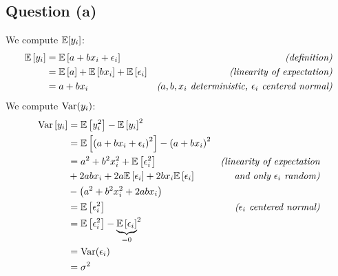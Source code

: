 \documentclass[12pt]{article}
\begin{document}
\subsection{Question (a)}
We compute \(\mathbb{E}[y_i]\):
\begin{align*}
    \mathbb{E} \left[ y_i \right]
     & = \mathbb{E} \left[ a + bx_i + \epsilon_i \right]                                      & \textit{(definition)}                                                  \\
     & = \mathbb{E} \left[ a \right] + \mathbb{E} \left[ b x_i \right] + \mathbb{E} \left[ \epsilon_i \right] & \textit{(linearity of expectation)}                                    \\
     & = a + b x_i                                                                    & \textit{(\(a, b, x_i\) deterministic, \(\epsilon_i\) centered normal)} \\
\end{align*}
We compute \(\textrm{Var}(y_i)\):
\begin{align*}
    \textrm{Var} \left[ y_i \right]
     & = \mathbb{E} \left[ y_i^2 \right] - \mathbb{E} \left[ y_i \right]^2                                                                              \\
     & = \mathbb{E} \left[ \left(a + bx_i + \epsilon_i \right)^2 \right] - \left(a + b x_i\right)^2                                             \\
     & = a^2 + b^2x_i^2 + \mathbb{E}\left[\epsilon_i^2\right]                                       & \textit{(linearity of expectation}        \\
     & + 2abx_i + 2a \mathbb{E} \left[\epsilon_i\right] + 2bx_i \mathbb{E}\left[\epsilon_i \right]          & \textit{and only \(\epsilon_i\) random)}  \\
     & - \left(a^2 + b^2x_i^2 + 2abx_i\right)                                                                                           \\
     & = \mathbb{E}\left[\epsilon_i^2\right]                                                        & \textit{(\(\epsilon_i\) centered normal)} \\
     & = \mathbb{E}\left[\epsilon_i^2\right] - {\underbrace{\mathbb{E}\left[\epsilon_i\right]}_{=0}}^2                                                  \\
     & = \textrm{Var}(\epsilon_i)                                                                                                               \\
     & = \sigma^2                                                                                                                       \\
\end{align*}
\end{document}
